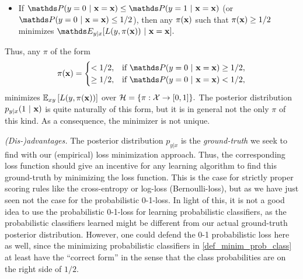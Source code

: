 \documentclass[a4paper]{article}
\begin{document}
{\begin{enumerate}
\begin{itemize}
%	
	\item If $ \P(y = 0~|~ \xv = \xv) \leq  \P(y = 1~|~ \xv = \xv) $ (or  $\P(y = 0~|~ \xv = \xv)\leq 1/2$), then any $\pi(\mathbf{x})$ such that $\pi(\mathbf{x}) \geq 1/2$ minimizes $\E_{y|x} [ L(y, \pi(\xv)) ~|~ \xv = \xv ] .$
%	
\end{itemize}
%
Thus, any $\pi$ of the form
%
\begin{align} \label{def_minim_prob_class}
%	
	\pix 
%	
	= \begin{cases}
			< 1/2 , & \mbox{if $\P(y = 0~|~ \xv = \xv)\geq 1/2,$} \\
			\geq 1/2 ,    & \mbox{if $\P(y = 0~|~ \xv = \xv)< 1/2,$} 
	\end{cases}
%	
\end{align}
%
minimizes $	\mathbb{E}_{xy}\left[  L(y,\pi(\mathbf{x})) \right]$ over $\mathcal{H} = \{ \pi:\mathcal{X} \to [0,1]    \}.$
%
The posterior distribution $p_{y|x}(1 ~|~ \mathbf{x})$ is quite naturally of this form, but it is in general not the only $\pi$ of this kind.
%
As a consequence, the minimizer is not unique.

\emph{(Dis-)advantages.}  The posterior distribution $p_{y|x}$ is the \emph{ground-truth} we seek to find with our (empirical) loss minimization approach. 
%
Thus, the corresponding loss function should give an incentive for any learning algorithm to find this ground-truth by minimizing the loss function.
%
This is the case for strictly proper scoring rules like the cross-entropy or log-loss (Bernoulli-loss), but as we have just seen not the case for the probabilistic 0-1-loss.
%
In light of this, it is not a good idea to use the probabilistic 0-1-loss for learning probabilistic classifiers, as the probabilistic classifiers learned might be different from our actual ground-truth posterior distribution.
%
However, one could defend the 0-1 probabilistic loss here as well, since the minimizing probabilistic classifiers in \eqref{def_minim_prob_class} at least have the ``correct form'' in the sense that the class probabilities are on the right side of $1/2.$


\end{enumerate}
}
\end{document}
